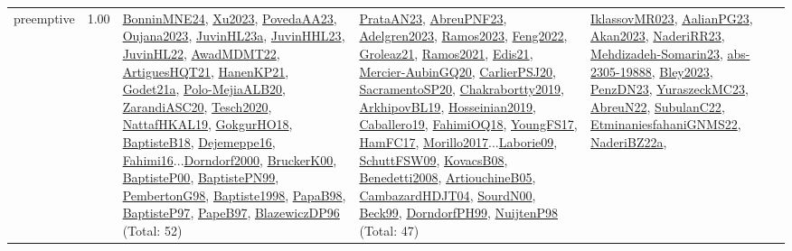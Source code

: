 {\begin{longtable}{p{3cm}r>{\raggedright\arraybackslash}p{6cm}>{\raggedright\arraybackslash}p{6cm}>{\raggedright\arraybackslash}p{8cm}}
\index{preemptive}\index{Concepts!preemptive}preemptive &  1.00 & \hyperref[detail:BonninMNE24]{BonninMNE24}, \hyperref[detail:Xu2023]{Xu2023}, \hyperref[detail:PovedaAA23]{PovedaAA23}, \hyperref[detail:Oujana2023]{Oujana2023}, \hyperref[detail:JuvinHL23a]{JuvinHL23a}, \hyperref[detail:JuvinHHL23]{JuvinHHL23}, \hyperref[detail:JuvinHL22]{JuvinHL22}, \hyperref[detail:AwadMDMT22]{AwadMDMT22}, \hyperref[detail:ArtiguesHQT21]{ArtiguesHQT21}, \hyperref[detail:HanenKP21]{HanenKP21}, \hyperref[detail:Godet21a]{Godet21a}, \hyperref[detail:Polo-MejiaALB20]{Polo-MejiaALB20}, \hyperref[detail:ZarandiASC20]{ZarandiASC20}, \hyperref[detail:Tesch2020]{Tesch2020}, \hyperref[detail:NattafHKAL19]{NattafHKAL19}, \hyperref[detail:GokgurHO18]{GokgurHO18}, \hyperref[detail:BaptisteB18]{BaptisteB18}, \hyperref[detail:Dejemeppe16]{Dejemeppe16}, \hyperref[detail:Fahimi16]{Fahimi16}...\hyperref[detail:Dorndorf2000]{Dorndorf2000}, \hyperref[detail:BruckerK00]{BruckerK00}, \hyperref[detail:BaptisteP00]{BaptisteP00}, \hyperref[detail:BaptistePN99]{BaptistePN99}, \hyperref[detail:PembertonG98]{PembertonG98}, \hyperref[detail:Baptiste1998]{Baptiste1998}, \hyperref[detail:PapaB98]{PapaB98}, \hyperref[detail:BaptisteP97]{BaptisteP97}, \hyperref[detail:PapeB97]{PapeB97}, \hyperref[detail:BlazewiczDP96]{BlazewiczDP96} (Total: 52) & \hyperref[detail:PrataAN23]{PrataAN23}, \hyperref[detail:AbreuPNF23]{AbreuPNF23}, \hyperref[detail:Adelgren2023]{Adelgren2023}, \hyperref[detail:Ramos2023]{Ramos2023}, \hyperref[detail:Feng2022]{Feng2022}, \hyperref[detail:Groleaz21]{Groleaz21}, \hyperref[detail:Ramos2021]{Ramos2021}, \hyperref[detail:Edis21]{Edis21}, \hyperref[detail:Mercier-AubinGQ20]{Mercier-AubinGQ20}, \hyperref[detail:CarlierPSJ20]{CarlierPSJ20}, \hyperref[detail:SacramentoSP20]{SacramentoSP20}, \hyperref[detail:Chakrabortty2019]{Chakrabortty2019}, \hyperref[detail:ArkhipovBL19]{ArkhipovBL19}, \hyperref[detail:Hosseinian2019]{Hosseinian2019}, \hyperref[detail:Caballero19]{Caballero19}, \hyperref[detail:FahimiOQ18]{FahimiOQ18}, \hyperref[detail:YoungFS17]{YoungFS17}, \hyperref[detail:HamFC17]{HamFC17}, \hyperref[detail:Morillo2017]{Morillo2017}...\hyperref[detail:Laborie09]{Laborie09}, \hyperref[detail:SchuttFSW09]{SchuttFSW09}, \hyperref[detail:KovacsB08]{KovacsB08}, \hyperref[detail:Benedetti2008]{Benedetti2008}, \hyperref[detail:ArtiouchineB05]{ArtiouchineB05}, \hyperref[detail:CambazardHDJT04]{CambazardHDJT04}, \hyperref[detail:SourdN00]{SourdN00}, \hyperref[detail:Beck99]{Beck99}, \hyperref[detail:DorndorfPH99]{DorndorfPH99}, \hyperref[detail:NuijtenP98]{NuijtenP98} (Total: 47) & \hyperref[detail:IklassovMR023]{IklassovMR023}, \hyperref[detail:AalianPG23]{AalianPG23}, \hyperref[detail:Akan2023]{Akan2023}, \hyperref[detail:NaderiRR23]{NaderiRR23}, \hyperref[detail:Mehdizadeh-Somarin23]{Mehdizadeh-Somarin23}, \hyperref[detail:abs-2305-19888]{abs-2305-19888}, \hyperref[detail:Bley2023]{Bley2023}, \hyperref[detail:PenzDN23]{PenzDN23}, \hyperref[detail:YuraszeckMC23]{YuraszeckMC23}, \hyperref[detail:AbreuN22]{AbreuN22}, \hyperref[detail:SubulanC22]{SubulanC22}, \hyperref[detail:EtminaniesfahaniGNMS22]{EtminaniesfahaniGNMS22}, \hyperref[detail:NaderiBZ22a]{NaderiBZ22a}, 
\end{longtable}}
